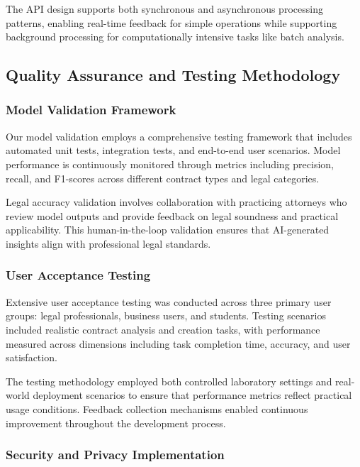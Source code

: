 The API design supports both synchronous and asynchronous processing patterns, enabling real-time feedback for simple operations while supporting background processing for computationally intensive tasks like batch analysis.

\subsection{Quality Assurance and Testing Methodology}

\subsubsection{Model Validation Framework}

Our model validation employs a comprehensive testing framework that includes automated unit tests, integration tests, and end-to-end user scenarios. Model performance is continuously monitored through metrics including precision, recall, and F1-scores across different contract types and legal categories.

Legal accuracy validation involves collaboration with practicing attorneys who review model outputs and provide feedback on legal soundness and practical applicability. This human-in-the-loop validation ensures that AI-generated insights align with professional legal standards.

\subsubsection{User Acceptance Testing}

Extensive user acceptance testing was conducted across three primary user groups: legal professionals, business users, and students. Testing scenarios included realistic contract analysis and creation tasks, with performance measured across dimensions including task completion time, accuracy, and user satisfaction.

The testing methodology employed both controlled laboratory settings and real-world deployment scenarios to ensure that performance metrics reflect practical usage conditions. Feedback collection mechanisms enabled continuous improvement throughout the development process.

\subsubsection{Security and Privacy Implementation}

